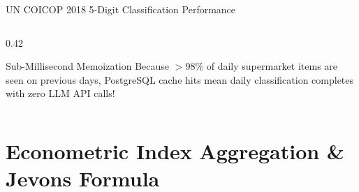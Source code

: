 \documentclass[aspectratio=169, 10pt]{beamer}
\begin{document}
\begin{frame}[shrink=8]{UN COICOP 2018 5-Digit Classification Performance}
\begin{columns}
\begin{column}{0.42\textwidth}
      \begin{alertblock}{Sub-Millisecond Memoization}
        Because $>98\%$ of daily supermarket items are seen on previous days, PostgreSQL cache hits mean daily classification completes with zero LLM API calls!
      \end{alertblock}
    \end{column}
  \end{columns}
\end{frame}

\section{Econometric Index Aggregation \& Jevons Formula}
\end{document}
